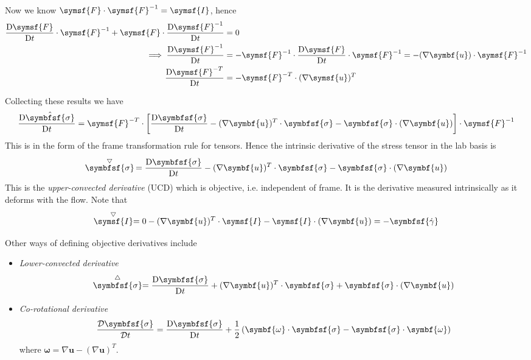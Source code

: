 \documentclass{jknotes}
\begin{document}
Now we know $\symsf{F} \cdot \symsf{F}^{-1} = \symsf{I}$, hence
\begin{align}
	\frac{\diffD \symsf{F}}{\diffD t} \cdot \symsf{F}^{-1} + \symsf{F} \cdot
	\frac{\diffD \symsf{F}^{-1}}{\diffD t} &= 0 \\
	\implies \frac{\diffD \symsf{F}^{-1}}{\diffD t} &= - \symsf{F}^{-1} \cdot
	\frac{\diffD \symsf{F}}{\diffD t} \cdot \symsf{F}^{-1} = -(\nabla
	\symbf{u})\cdot\symsf{F}^{-1}\\
	\frac{\diffD \symsf{F}^{-T}}{\diffD t} &= - \symsf{F}^{-T} \cdot (\nabla
	\symsf{u})^T
\end{align}

Collecting these results we have
\begin{equation}
	\frac{\diffD \hat{\symbfsf{\sigma}}}{\diffD t} = \symsf{F}^{-T} \cdot
	\left[ \frac{\diffD \symbfsf{\sigma}}{\diffD t} - (\nabla \symbf{u})^T
		\cdot \symbfsf{\sigma} - \symbfsf{\sigma} \cdot (\nabla
	\symbf{u})\right] \cdot \symsf{F}^{-1}
\end{equation}
This is in the form of the frame transformation rule for tensors. Hence the
intrinsic derivative of the stress tensor in the lab basis is
\begin{equation}
	\stackrel{\bigtriangledown}{\symbfsf{\sigma}}\, = \frac{\diffD
		\symbfsf{\sigma}}{\diffD t} - (\nabla \symbf{u})^T \cdot
		\symbfsf{\sigma} - \symbfsf{\sigma} \cdot (\nabla \symbf{u})
\end{equation}
This is the \emph{upper-convected derivative} (UCD) which is objective, i.e.
independent of frame. It is the derivative measured intrinsically as it
deforms with the flow. Note that
\begin{equation}
	\stackrel{\bigtriangledown}{\symsf{I}} = 0 - (\nabla \symbf{u})^T\cdot
	\symsf{I} - \symsf{I}\cdot (\nabla \symbf{u}) = -\symbfsf{\srate}
\end{equation}

Other ways of defining objective derivatives include
\begin{itemize}
	\item \emph{Lower-convected derivative}
		\begin{equation}
			\stackrel{\bigtriangleup}{\symbfsf{\sigma}} = \frac{\diffD
		\symbfsf{\sigma}}{\diffD t} + (\nabla \symbf{u})^T \cdot
		\symbfsf{\sigma} + \symbfsf{\sigma} \cdot (\nabla \symbf{u})
	\end{equation}
	\item \emph{Co-rotational derivative}
		\begin{equation}
			\frac{\mathcal{D} \symbfsf{\sigma}}{\mathcal{D} t} = \frac{\diffD
				\symbfsf{\sigma}}{\diffD t} + \frac{1}{2} \left(
				\symbf{\omega}\cdot\symbfsf{\sigma} -
			\symbfsf{\sigma}\cdot\symbf{\omega}\right)
		\end{equation}
		where $\symbf{\omega} = \nabla \symbf{u} - (\nabla \symbf{u})^T$.
\end{itemize}
\end{document}
